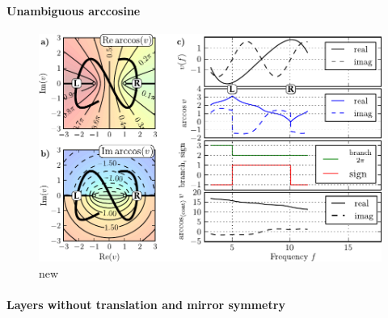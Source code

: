 \paragraph{Unambiguous arccosine} %
\begin{figure} \caption{new}  \centering \includegraphics[width=\textwidth]{img/continuous_arccos/continuous_arccos_new.pdf}  \end{figure}\clearpage
\paragraph{Layers without translation and mirror symmetry} %
\paragraph{} %

